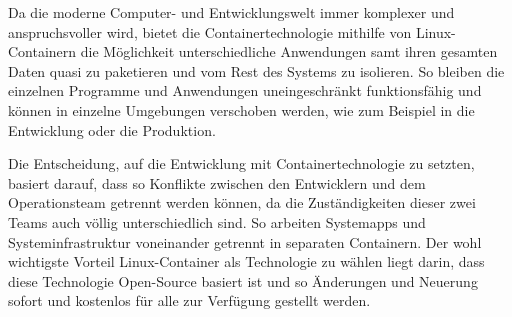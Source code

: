 
Da die moderne Computer- und Entwicklungswelt immer komplexer und anspruchsvoller wird, bietet die Containertechnologie mithilfe von Linux-Containern die Möglichkeit unterschiedliche Anwendungen samt ihren gesamten Daten quasi zu paketieren und vom Rest des Systems zu isolieren. So bleiben die einzelnen Programme und Anwendungen uneingeschränkt funktionsfähig und können in einzelne Umgebungen verschoben werden, wie zum Beispiel in die Entwicklung oder die Produktion. \cite{Container}

Die Entscheidung, auf die Entwicklung mit Containertechnologie zu setzten, basiert darauf, dass so Konflikte zwischen den Entwicklern und dem Operationsteam getrennt werden können, da die Zuständigkeiten dieser zwei Teams auch völlig unterschiedlich sind. So arbeiten Systemapps und Systeminfrastruktur voneinander getrennt in separaten Containern. Der wohl wichtigste Vorteil Linux-Container als Technologie zu wählen liegt darin, dass diese Technologie Open-Source basiert ist und so Änderungen und Neuerung sofort und kostenlos für alle zur Verfügung gestellt werden. \cite{Container}
